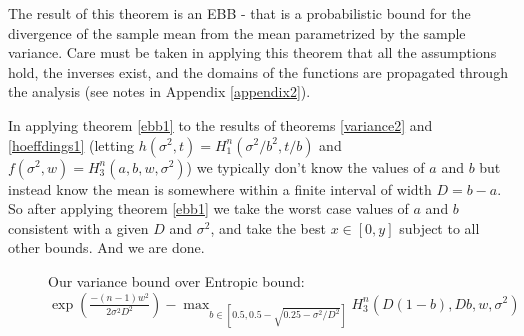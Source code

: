 \documentclass[aap,preprint]{imsart}
\begin{document}
The result of this theorem is an EBB - that is a probabilistic bound for the divergence of the sample mean from the mean parametrized by the sample variance. Care must be taken in applying this theorem that all the assumptions hold, the inverses exist, and the domains of the functions are propagated through the analysis (see notes in Appendix \ref{appendix2}).

In applying theorem \ref{ebb1} to the results of theorems \ref{variance2} and \ref{hoeffdings1} (letting $h(\sigma^2,t)=H_1^n\left(\sigma^2/b^2,t/b\right)$ and $f(\sigma^2,w)=H_3^n(a,b,w,\sigma^2)$) we typically don't know the values of $a$ and $b$ but instead know the mean is somewhere within a finite interval of width $D=b-a$.
So after applying theorem \ref{ebb1} we take the worst case values of $a$ and $b$ consistent with a given $D$ and $\sigma^2$, and take the best $x\in[0,y]$ subject to all other bounds.
And we are done.

\begin{figure}[h]
\centering
\captionsetup{justification=centering,margin=0.01cm}
\caption{Our variance bound over Entropic bound:\\$\scriptstyle\exp\left(\frac{-(n-1)w^2}{2\sigma^2D^2}\right)-\max_{b\in\left[0.5,0.5-\sqrt{0.25-\sigma^2/D^2}\right]}H_3^n\left(D(1-b),Db,w,\sigma^2\right)$}
\label{biggraph2}
\end{figure}
\end{document}
